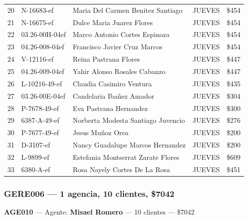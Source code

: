 \documentclass[11pt,a4paper]{article}
\newcommand{\money}[1]{\$\num{#1}}
\begin{document}
\begin{center}
\begin{longtable}{rlp{6.5cm}lr}
20 & N-16683-ef & Maria Del Carmen Benitez Santiago & JUEVES & \money{454} \\
21 & N-16675-ef & Dulce Maria Juarez Flores & JUEVES & \money{454} \\
22 & 03.26-00H-04ef & Marco Antonio Cortes Espinoza & JUEVES & \money{454} \\
23 & 04.26-008-04ef & Francisco Javier Cruz Marcos & JUEVES & \money{454} \\
24 & V-12116-ef & Reina Pastrana Flores & JUEVES & \money{447} \\
25 & 04.26-009-04ef & Yahir Alonso Rosales Cabanzo & JUEVES & \money{447} \\
26 & L-10216-49-ef & Claudia Casimiro Ventura & JUEVES & \money{435} \\
27 & 03.26-00E-04ef & Candelaria Ibañez Amador & JUEVES & \money{304} \\
28 & P-7678-49-ef & Eva Pastrana Hernandez & JUEVES & \money{300} \\
29 & 6387-A-49-ef & Norberta Modesta Santiago Juvencio & JUEVES & \money{276} \\
30 & P-7677-49-ef & Jesus Muñoz Orea & JUEVES & \money{200} \\
31 & D-3107-ef & Nancy Guadalupe Marcos Hernandez & JUEVES & \money{200} \\
32 & L-9899-ef & Estefania Montserrat Zarate Flores & JUEVES & \money{609} \\
33 & 6380-A-ef & Rosa Nayely Cortes De La Rosa & JUEVES & \money{451} \\

\bottomrule
\end{longtable}
\end{center}
\subsubsection{GERE006 --- 1 agencia, 10 clientes, \money{7042}}

\noindent\textbf{AGE010} --- Agente: \textbf{Misael Romero} --- 10 clientes --- \money{7042}
\end{document}

